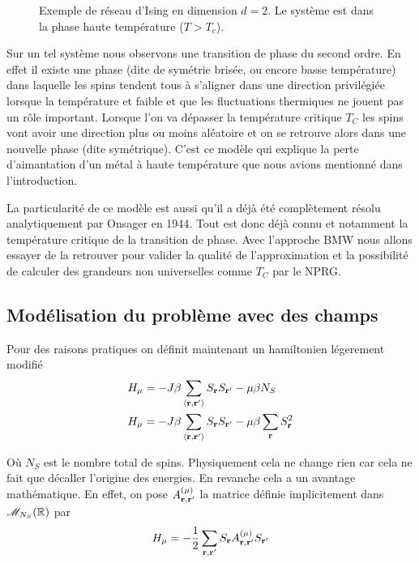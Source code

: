 \documentclass[10pt]{article}
\begin{document}
\begin{multicols}{2}
\begin{figure}[H]
\begin{center}
\begin{picture}
\end{picture}
\end{center}
\caption{Exemple de réseau d'Ising en dimension $d=2$. Le système est dans la phase haute température ($T>T_c$).}
\end{figure}

Sur un tel système nous observons une transition de phase du second ordre. En effet il existe une phase (dite de symétrie brisée, ou encore basse température) dans laquelle les spins tendent tous à s'aligner dans une direction privilégiée lorsque la température et faible et que les fluctuations thermiques ne jouent pas un rôle important. Lorsque l'on va dépasser la température critique $T_C$ les spins vont avoir une direction plus ou moins aléatoire et on se retrouve alors dans une nouvelle phase (dite symétrique). C'est ce modèle qui explique la perte d'aimantation d'un métal à haute température que nous avions mentionné dans l'introduction. 

La particularité de ce modèle est aussi qu'il a déjà été complètement résolu analytiquement par Onsager \cite{Onsager} en 1944. Tout est donc déjà connu et notamment la température critique de la transition de phase. Avec l'approche BMW nous allons essayer de la retrouver pour valider la qualité de l'approximation et la possibilité de calculer des grandeurs non universelles comme $T_C$ par le NPRG. 


\vspace*{11pt} 

\subsection{Modélisation du problème avec des champs}

Pour des raisons pratiques on définit maintenant un hamiltonien légerement modifié
\begin{align}
  H_\mu &= -J\beta \sum_{\left<\rv, \rv'\right>}S_\rv S_{\rv'} - \mu \beta N_S \\
  H_\mu  &= -J\beta \sum_{\left<\rv, \rv'\right>}S_\rv S_{\rv'} - \mu \beta \sum_\rv S_\rv^2 
\end{align}

Où $N_S$ est le nombre total de spins. Physiquement cela ne change rien car cela ne fait que décaller l'origine des energies. En revanche cela a un avantage mathématique. En effet, on pose $A_{\rv, \rv'}^{(\mu)}$ la matrice définie implicitement dans $\mathscr{M}_{N_S}(\R)$ par
\begin{equation}
  H_\mu  = -\frac{1}{2} \sum_{\rv, \rv'} S_\rv A_{\rv, \rv'}^{(\mu)}S_{\rv'}
\end{equation}


\end{multicols}
\end{document}
